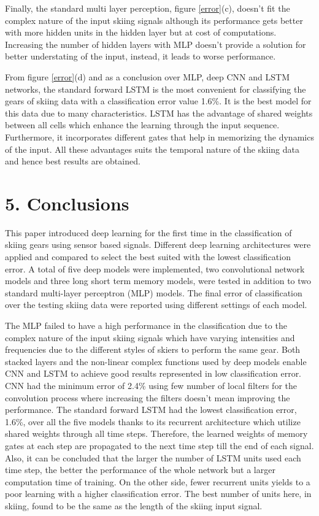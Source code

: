 \documentclass[12pt,a4paper]{article}
\begin{document}
Finally, the standard multi layer perception, figure \ref{error}(c), doesn't fit the complex nature of the input skiing signals although its performance gets better with more hidden units in the hidden layer but at cost of computations. Increasing the number of hidden layers with MLP doesn’t provide a solution for better understating of the input, instead, it leads to worse performance. 

From figure \ref{error}(d) and as a conclusion over MLP, deep CNN and LSTM networks, the standard forward LSTM is the most convenient for classifying the gears of skiing data with a classification error value 1.6\%. It is the best model for this data due to many characteristics. LSTM has the advantage of shared weights between all cells which enhance the learning through the input sequence. Furthermore, it incorporates different gates that help in memorizing the dynamics of the input. All these advantages suits the temporal nature of the skiing data and hence best results are obtained.


\section*{5. Conclusions}
This paper introduced deep learning for the first time in the classification of skiing gears using sensor based signals. Different deep learning architectures were applied and compared to select the best suited with the lowest classification error. A total of five deep models were implemented, two convolutional network models and three long short term memory models, were tested in addition to two standard multi-layer perceptron (MLP) models. The final error of classification over the testing skiing data were reported using different settings of each model. 

The MLP failed to have a high performance in the classification due to the complex nature of the input skiing signals which have varying intensities and frequencies due to the different styles of skiers to perform the same gear. Both stacked layers and the non-linear complex functions used by deep models enable CNN and LSTM to achieve good results represented in low classification error. CNN had the minimum error of 2.4\% using few number of local filters for the convolution process where increasing the filters doesn't mean improving the performance. The standard forward LSTM had the lowest classification error, 1.6\%, over all the five models thanks to its recurrent architecture which utilize shared weights through all time steps. Therefore, the learned weights of memory gates at each step are propagated to the next time step till the end of each signal. Also, it can be concluded that the larger the number of LSTM units used each time step, the better the performance of the whole network but a larger computation time of training. On the other side, fewer recurrent units yields to a poor learning with a higher classification error. The best number of units here, in skiing, found to be the same as the length of the skiing input signal. 
\end{document}
